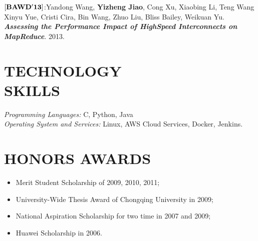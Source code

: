 \documentclass[margin, 10pt]{res} %
\begin{document}
\begin{resume}
$[\bf{BAWD'13}]$:Yandong Wang, \textbf{Yizheng Jiao}, Cong Xu, Xiaobing Li, Teng Wang Xinyu Yue, Cristi Cira, Bin Wang, Zhuo Liu, Bliss Bailey, Weikuan Yu. 
\textbf{\textit{Assessing the Performance Impact of HighSpeed Interconnects on MapReduce}}.
2013.





\section{TECHNOLOGY \\ SKILLS} 

{\sl Programming Languages:} C, Python, Java \\
{\sl Operating System and Services:} Linux, AWS Cloud Services, Docker, Jenkins. \\







\section{HONORS AWARDS} 
\begin{itemize}
\item Merit Student Scholarship of 2009, 2010, 2011;
\item University-Wide Thesis Award of Chongqing University in 2009;
\item National Aspiration Scholarship for two time in 2007 and 2009;
\item Huawei Scholarship in 2006.
\end{itemize}


\end{resume}
\end{document}
